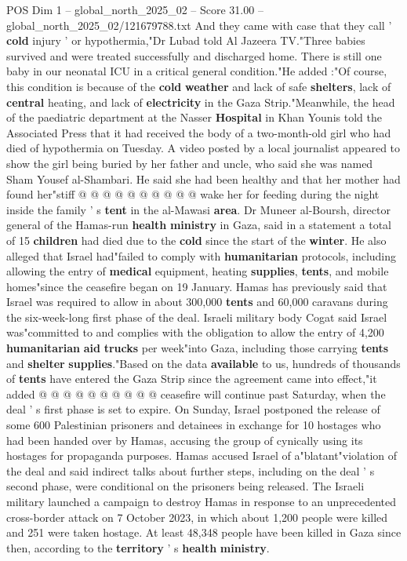 \begin{textsample}{POS Dim 1 – global\_north\_2025\_02 – Score 31.00 – global\_north\_2025\_02/121679788.txt}
And they came with case that they call ' \textbf{cold} injury ' or hypothermia,"Dr Lubad told Al Jazeera TV."Three babies survived and were treated successfully and discharged home.
There is still one baby in our neonatal ICU in a critical general condition."He added :"Of course, this condition is because of the \textbf{cold} \textbf{weather} and lack of safe \textbf{shelters}, lack of \textbf{central} heating, and lack of \textbf{electricity} in the Gaza Strip."Meanwhile, the head of the paediatric department at the Nasser \textbf{Hospital} in Khan Younis told the Associated Press that it had received the body of a two-month-old girl who had died of hypothermia on Tuesday.
A video posted by a local journalist appeared to show the girl being buried by her father and uncle, who said she was named Sham Yousef al-Shambari.
He said she had been healthy and that her mother had found her"stiff @ @ @ @ @ @ @ @ @ @ wake her for feeding during the night inside the family ' s \textbf{tent} in the al-Mawasi \textbf{area}.
Dr Muneer al-Boursh, director general of the Hamas-run \textbf{health} \textbf{ministry} in Gaza, said in a statement a total of 15 \textbf{children} had died due to the \textbf{cold} since the start of the \textbf{winter}.
He also alleged that Israel had"failed to comply with \textbf{humanitarian} protocols, including allowing the entry of \textbf{medical} equipment, heating \textbf{supplies}, \textbf{tents}, and mobile homes"since the ceasefire began on 19 January.
Hamas has previously said that Israel was required to allow in about 300,000 \textbf{tents} and 60,000 caravans during the six-week-long first phase of the deal.
Israeli military body Cogat said Israel was"committed to and complies with the obligation to allow the entry of 4,200 \textbf{humanitarian} \textbf{aid} \textbf{trucks} per week"into Gaza, including those carrying \textbf{tents} and \textbf{shelter} \textbf{supplies}."Based on the data \textbf{available} to us, hundreds of thousands of \textbf{tents} have entered the Gaza Strip since the agreement came into effect,"it added @ @ @ @ @ @ @ @ @ @ ceasefire will continue past Saturday, when the deal ' s first phase is set to expire.
On Sunday, Israel postponed the release of some 600 Palestinian prisoners and detainees in exchange for 10 hostages who had been handed over by Hamas, accusing the group of cynically using its hostages for propaganda purposes.
Hamas accused Israel of a"blatant"violation of the deal and said indirect talks about further steps, including on the deal ' s second phase, were conditional on the prisoners being released.
The Israeli military launched a campaign to destroy Hamas in response to an unprecedented cross-border attack on 7 October 2023, in which about 1,200 people were killed and 251 were taken hostage.
At least 48,348 people have been killed in Gaza since then, according to the \textbf{territory} ' s \textbf{health} \textbf{ministry}.


\end{textsample}
